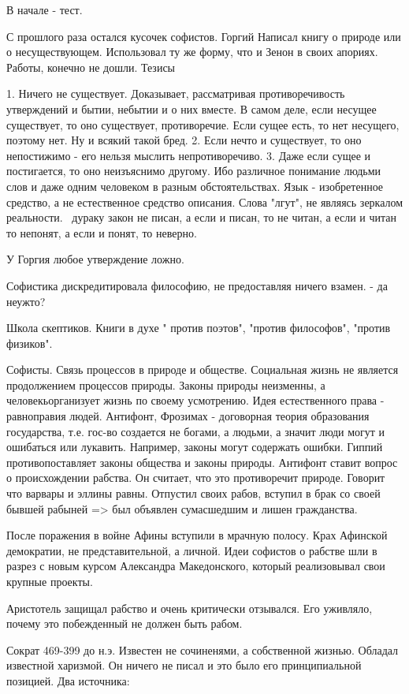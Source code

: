 В начале - тест.

С прошлого раза остался кусочек софистов. 
Горгий 
Написал книгу о природе или о несуществующем. Использовал ту же форму, что и Зенон в своих апориях. Работы, конечно не дошли.
Тезисы

	1. Ничего не существует. Доказывает, рассматривая противоречивость утверждений и бытии, небытии и о них вместе. В самом деле, если несущее существует, то оно существует, противоречие. Если сущее есть, то нет несущего, поэтому нет. Ну и всякий такой бред.
	2. Если нечто и существует, то оно непостижимо - его нельзя мыслить непротиворечиво.
	3. Даже если сущее и постигается, то оно неизъяснимо другому. Ибо различное понимание людьми слов и даже одним человеком в разным обстоятельствах. Язык - изобретенное средство, а не естественное средство описания. Слова "лгут", не являясь зеркалом реальности. ~дураку закон не писан, а если и писан, то не читан, а если и читан то непонят, а если и понят, то неверно.

У Горгия любое утверждение ложно.

Софистика дискредитировала философию, не предоставляя ничего взамен. - да неужто?

Школа скептиков. Книги в духе " против поэтов", "против философов", "против физиков".

Софисты.
Связь процессов в природе и обществе. Социальная жизнь не является продолжением процессов природы. Законы природы неизменны, а человекьорганизует жизнь по своему усмотрению. Идея естественного права - равноправия людей. Антифонт, Фрозимах - договорная теория образования государства, т.е. гос-во создается не богами, а людьми, а значит люди могут и ошибаться или лукавить. Например, законы могут содержать ошибки. Гиппий противопоставляет законы общества и законы природы. Антифонт ставит вопрос о происхождении рабства. Он считает, что это противоречит природе. Говорит что варвары и эллины равны. Отпустил своих рабов, вступил в брак со своей бывшей рабыней => был объявлен сумасшедшим и лишен гражданства.

После поражения в войне Афины вступили в мрачную полосу. Крах Афинской демократии, не представительной, а личной. Идеи софистов о рабстве шли в разрез с новым курсом Александра Македонского, который реализовывал свои крупные проекты.

Аристотель защищал рабство и очень критически отзывался. Его уживляло, почему это побежденный не должен быть рабом.

Сократ
469-399 до н.э.
Известен не сочиненями, а собственной жизнью. Обладал известной харизмой. Он ничего не писал и это  было его принципиальной позицией. Два источника: 


